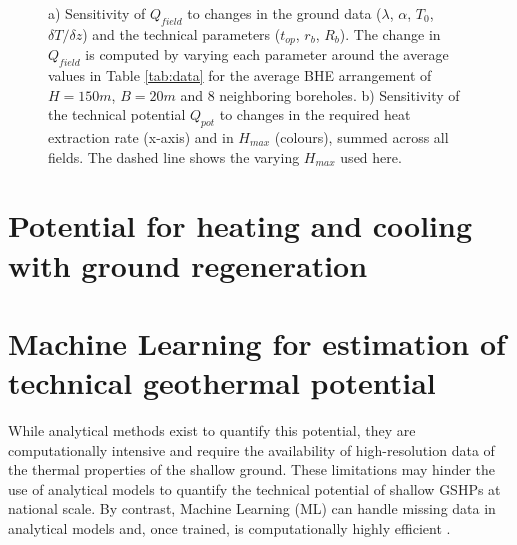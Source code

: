 \begin{figure}[tb]
\centering
{}
\caption{a) Sensitivity of $Q_{field}$ to changes in the ground data ($\lambda$, $\alpha$, $T_0$, $\delta T / \delta z$) and the technical parameters ($t_{op}$, $r_b$, $R_b$). The change in $Q_{field}$ is computed by varying each parameter around the average values in Table \ref{tab:data} for the average BHE arrangement of $H=150m$, $B=20m$ and 8 neighboring boreholes.
b) Sensitivity of the technical potential $Q_{pot}$ to changes in the required heat extraction rate (x-axis) and in $H_{max}$ (colours), summed across all fields. The dashed line shows the varying $H_{max}$ used here.}
\label{fig:sensitivity}
\end{figure}


\section{Potential for heating and cooling with ground regeneration}

\section{Machine Learning for estimation of technical geothermal potential}
\label{geo_ML}

While analytical methods exist to quantify this potential, they are computationally intensive and require the availability of high-resolution data of the thermal properties of the shallow ground. These limitations may hinder the use of analytical models to quantify the technical potential of shallow GSHPs at national scale. By contrast, Machine Learning (ML) can handle missing data in analytical models and, once trained, is computationally highly efficient \cite{assouline_machine_2019-1}.  %


